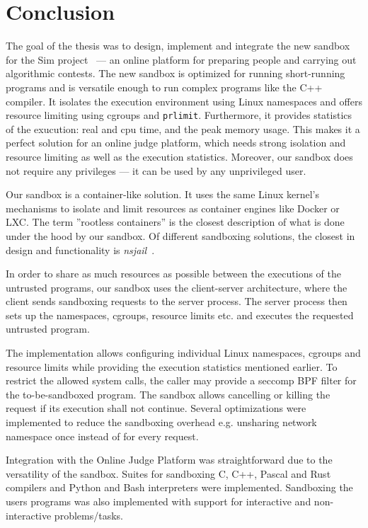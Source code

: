 \documentclass[en]{pracamgr}
\begin{document}
\chapter{Conclusion}\label{chapter:conclusion}

The goal of the thesis was to design, implement and integrate the new sandbox for the Sim project~\cite{sim_project} --- an online platform for preparing people and carrying out algorithmic contests. The new sandbox is optimized for running short-running programs and is versatile enough to run complex programs like the C++ compiler. It isolates the execution environment using Linux namespaces and offers resource limiting using cgroups and \texttt{prlimit}. Furthermore, it provides statistics of the exucution: real and cpu time, and the peak memory usage. This makes it a perfect solution for an online judge platform, which needs strong isolation and resource limiting as well as the execution statistics. Moreover, our sandbox does not require any privileges --- it can be used by any unprivileged user.

Our sandbox is a container-like solution. It uses the same Linux kernel's mechanisms to isolate and limit resources as container engines like Docker or LXC. The term ''rootless containers'' is the closest description of what is done under the hood by our sandbox. Of different sandboxing solutions, the closest in design and functionality is \textit{nsjail}~\cite{google/nsjail}.

In order to share as much resources as possible between the executions of the untrusted programs, our sandbox uses the client-server architecture, where the client sends sandboxing requests to the server process. The server process then sets up the namespaces, cgroups, resource limits etc. and executes the requested untrusted program.

The implementation allows configuring individual Linux namespaces, cgroups and resource limits while providing the execution statistics mentioned earlier. To restrict the allowed system calls, the caller may provide a seccomp BPF filter for the to-be-sandboxed program. The sandbox allows cancelling or killing the request if its execution shall not continue. Several optimizations were implemented to reduce the sandboxing overhead e.g. unsharing network namespace once instead of for every request.

Integration with the Online Judge Platform was straightforward due to the versatility of the sandbox. Suites for sandboxing C, C++, Pascal and Rust compilers and Python and Bash interpreters were implemented. Sandboxing the users programs was also implemented with support for interactive and non-interactive problems/tasks.
\end{document}
